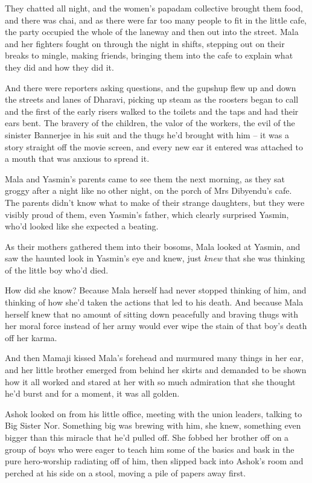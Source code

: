 They chatted all night, and the women's papadam collective brought
them food, and there was chai, and as there were far too many
people to fit in the little cafe, the party occupied the whole of
the laneway and then out into the street. Mala and her fighters
fought on through the night in shifts, stepping out on their breaks
to mingle, making friends, bringing them into the cafe to explain
what they did and how they did it.

And there were reporters asking questions, and the gupshup flew up
and down the streets and lanes of Dharavi, picking up steam as the
roosters began to call and the first of the early risers walked to
the toilets and the taps and had their ears bent. The bravery of
the children, the valor of the workers, the evil of the sinister
Bannerjee in his suit and the thugs he'd brought with him -- it was
a story straight off the movie screen, and every new ear it entered
was attached to a mouth that was anxious to spread it.

Mala and Yasmin's parents came to see them the next morning, as
they sat groggy after a night like no other night, on the porch of
Mrs Dibyendu's cafe. The parents didn't know what to make of their
strange daughters, but they were visibly proud of them, even
Yasmin's father, which clearly surprised Yasmin, who'd looked like
she expected a beating.

As their mothers gathered them into their bosoms, Mala looked at
Yasmin, and saw the haunted look in Yasmin's eye and knew, just
\emph{knew} that she was thinking of the little boy who'd died.

How did she know? Because Mala herself had never stopped thinking
of him, and thinking of how she'd taken the actions that led to his
death. And because Mala herself knew that no amount of sitting down
peacefully and braving thugs with her moral force instead of her
army would ever wipe the stain of that boy's death off her karma.

And then Mamaji kissed Mala's forehead and murmured many things in
her ear, and her little brother emerged from behind her skirts and
demanded to be shown how it all worked and stared at her with so
much admiration that she thought he'd burst and for a moment, it
was all golden.

Ashok looked on from his little office, meeting with the union
leaders, talking to Big Sister Nor. Something big was brewing with
him, she knew, something even bigger than this miracle that he'd
pulled off. She fobbed her brother off on a group of boys who were
eager to teach him some of the basics and bask in the pure
hero-worship radiating off of him, then slipped back into Ashok's
room and perched at his side on a stool, moving a pile of papers
away first.

